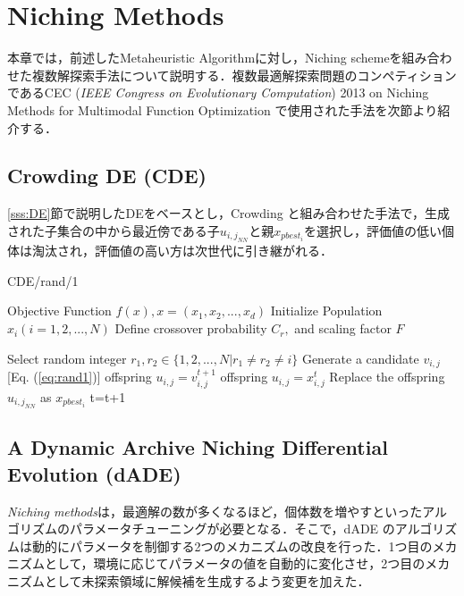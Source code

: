 \documentclass[a4j,11pt]{jarticle}
\begin{document}

\newpage
\section{Niching Methods}
\label{sec:nm}
本章では，前述したMetaheuristic Algorithmに対し，Niching schemeを組み合わせた複数解探索手法について説明する．複数最適解探索問題のコンペティションであるCEC ({\it IEEE Congress on Evolutionary Computation})  2013 on Niching Methods for Multimodal Function Optimization \cite{CEC2013} で使用された手法を次節より紹介する．

\subsection{Crowding DE (CDE)}
\label{ss:cde}
\ref{sss:DE}節で説明したDEをベースとし，Crowding \cite{Crowding} と組み合わせた手法で，生成された子集合の中から最近傍である子$u_{{i,j}_{NN}}$と親$x_{pbest_i}$を選択し，評価値の低い個体は淘汰され，評価値の高い方は次世代に引き継がれる．

\begin{algorithm}[H]
\caption{CDE/rand/1}
\label{code:cde}
\begin{algorithmic}[3]
\REQUIRE Objective Function $f(x), x=(x_1,x_2,...,x_d)$
\STATE Initialize Population $x_i (i=1,2,...,N)$ 
\STATE Define crossover probability $C_r,$ and scaling factor $F$

\STATE Select random integer $r_1, r_2 \in \{ 1,2,..., N| r_1 \neq r_2 \neq i\}$
\STATE Generate a candidate $v_{i,j}$  [Eq. (\ref{eq:rand1})]
\STATE offspring $u_{i,j} = v_{i,j}^{t+1}$
\STATE offspring $u_{i,j} = x_{i,j}^t$
\ENDIF
\ENDFOR
{}
\STATE Replace the offspring $u_{{i,j}_{NN}}$ as $x_{pbest_i}$
\ENDIF
\ENDFOR
\STATE t=t+1
\ENDWHILE
\end{algorithmic}
\end{algorithm}

\subsection{A Dynamic Archive Niching Differential Evolution (dADE)}
\label{ss:dADE}
{\it Niching methods}は，最適解の数が多くなるほど，個体数を増やすといったアルゴリズムのパラメータチューニングが必要となる．そこで，dADE \cite{dADE} のアルゴリズムは動的にパラメータを制御する2つのメカニズムの改良を行った．1つ目のメカニズムとして，環境に応じてパラメータの値を自動的に変化させ，2つ目のメカニズムとして未探索領域に解候補を生成するよう変更を加えた．
\end{document}
